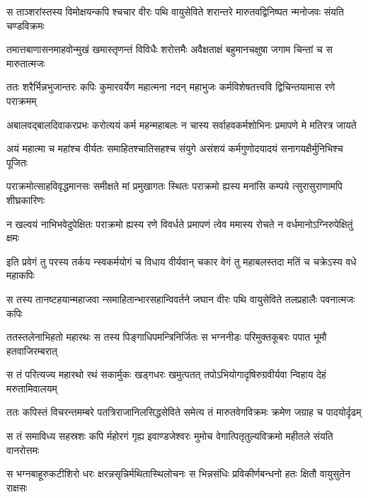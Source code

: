 \fourlineindentedshloka
{स ताञ्शरांस्तस्य विमोक्षयन्कपि}
{श्चचार वीरः पथि वायुसेविते}
{शरान्तरे मारुतवद्विनिष्पत}
{न्मनोजवः संयति चण्डविक्रमः} %

\fourlineindentedshloka
{तमात्तबाणासनमाहवोन्मुखं}
{ खमास्तृणन्तं विविधैः शरोत्तमैः}
{अवैक्षताक्षं बहुमानचक्षुषा}
{ जगाम चिन्तां च स मारुतात्मजः} %

\fourlineindentedshloka
{ततः शरैर्भिन्नभुजान्तरः कपिः}
{ कुमारवर्येण महात्मना नदन्}
{महाभुजः कर्मविशेषतत्त्ववि}
{द्विचिन्तयामास रणे पराक्रमम्} %

\fourlineindentedshloka
{अबालवद्बालदिवाकरप्रभः}
{ करोत्ययं कर्म महन्महाबलः}
{न चास्य सर्वाहवकर्मशोभिनः}
{ प्रमापणे मे मतिरत्र जायते} %

\fourlineindentedshloka
{अयं महात्मा च महांश्च वीर्यतः}
{ समाहितश्चातिसहश्च संयुगे}
{असंशयं कर्मगुणोदयादयं}
{ सनागयक्षैर्मुनिभिश्च पूजितः} %

\fourlineindentedshloka
{पराक्रमोत्साहविवृद्धमानसः}
{ समीक्षते मां प्रमुखागतः स्थितः}
{पराक्रमो ह्यस्य मनांसि कम्पये}
{त्सुरासुराणामपि शीघ्रकारिणः} %

\fourlineindentedshloka
{न खल्वयं नाभिभवेदुपेक्षितः}
{ पराक्रमो ह्यस्य रणे विवर्धते}
{प्रमापणं त्वेव ममास्य रोचते}
{ न वर्धमानोऽग्निरुपेक्षितुं क्षमः} %

\fourlineindentedshloka
{इति प्रवेगं तु परस्य तर्कय}
{न्स्वकर्मयोगं च विधाय वीर्यवान्}
{चकार वेगं तु महाबलस्तदा}
{ मतिं च चक्रेऽस्य वधे महाकपिः} %

\fourlineindentedshloka
{स तस्य तानष्टहयान्महाजवा}
{न्समाहितान्भारसहान्विवर्तने}
{जघान वीरः पथि वायुसेविते}
{ तलप्रहालैः पवनात्मजः कपिः} %

\fourlineindentedshloka
{ततस्तलेनाभिहतो महारथः}
{ स तस्य पिङ्गाधिपमन्त्रिनिर्जितः}
{स भग्ननीडः परिमुक्तकूबरः}
{ पपात भूमौ हतवाजिरम्बरात्} %

\fourlineindentedshloka
{स तं परित्यज्य महारथो रथं}
{ सकार्मुकः खड्गधरः खमुत्पतत्}
{तपोऽभियोगादृषिरुग्रवीर्यवा}
{न्विहाय देहं मरुतामिवालयम्} %

\fourlineindentedshloka
{ततः कपिस्तं विचरन्तमम्बरे}
{ पतत्रिराजानिलसिद्धसेविते}
{समेत्य तं मारुतवेगविक्रमः}
{ क्रमेण जग्राह च पादयोर्दृढम्} %

\fourlineindentedshloka
{स तं समाविध्य सहस्रशः कपि}
{र्महोरगं गृह्य इवाण्डजेश्वरः}
{मुमोच वेगात्पितृतुल्यविक्रमो}
{ महीतले संयति वानरोत्तमः} %

\fourlineindentedshloka
{स भग्नबाहूरुकटीशिरो धरः}
{ क्षरन्नसृन्निर्मथितास्थिलोचनः}
{स भिन्नसंधिः प्रविकीर्णबन्धनो}
{ हतः क्षितौ वायुसुतेन राक्षसः} %

